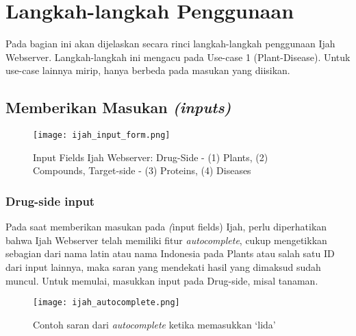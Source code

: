 \chapter{Langkah-langkah Penggunaan}
Pada bagian ini akan dijelaskan secara rinci langkah-langkah penggunaan Ijah Webserver. Langkah-langkah ini mengacu pada Use-case 1 (Plant-Disease). Untuk use-case lainnya mirip, hanya berbeda pada masukan yang diisikan.

\section{Memberikan Masukan \emph{(inputs)}}

\begin{figure}[H]
	\centering
	\texttt{[image: ijah\_input\_form.png]}
	\caption{Input Fields Ijah Webserver: Drug-Side - (1) Plants, (2) Compounds, Target-side - (3) Proteins, (4) Diseases}
	\label{fig:ijah_input_form}
	\end{figure}

	\subsection{Drug-side input}
	Pada saat memberikan masukan pada \emph(input fields) Ijah, perlu diperhatikan bahwa Ijah Webserver telah memiliki fitur \emph{autocomplete}, cukup mengetikkan sebagian dari nama latin atau nama Indonesia pada Plants atau salah satu ID dari input lainnya, maka saran yang mendekati hasil yang dimaksud sudah muncul. Untuk memulai, masukkan input pada Drug-side, misal tanaman.

	\begin{figure}[H]
		\centering
		\texttt{[image: ijah\_autocomplete.png]}
		\caption{Contoh saran dari \emph{autocomplete} ketika memasukkan `lida'}
		\label{fig:ijah_autocomplete_click}
		\end{figure}

